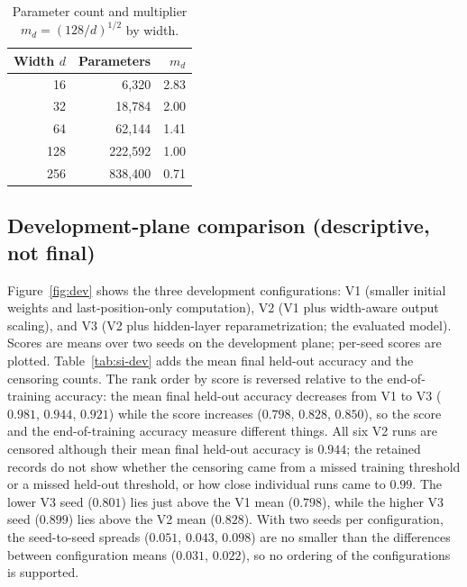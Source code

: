 \documentclass{article}
\begin{document}
\begin{table}[h]
\centering
\caption{Parameter count and multiplier $m_d=(128/d)^{1/2}$ by width.}
\label{tab:si-model}
\small
\begin{tabular}{rrr}
\toprule
Width $d$ & Parameters & $m_d$ \\
\midrule
16 & 6{,}320 & 2.83 \\
32 & 18{,}784 & 2.00 \\
64 & 62{,}144 & 1.41 \\
128 & 222{,}592 & 1.00 \\
256 & 838{,}400 & 0.71 \\
\bottomrule
\end{tabular}
\end{table}

\subsection{Development-plane comparison (descriptive, not final)}
\label{sec:si-dev}
Figure~\ref{fig:dev} shows the three development configurations: V1 (smaller initial weights and last-position-only computation), V2 (V1 plus width-aware output scaling), and V3 (V2 plus hidden-layer reparametrization; the evaluated model). Scores are means over two seeds on the development plane; per-seed scores are plotted. Table~\ref{tab:si-dev} adds the mean final held-out accuracy and the censoring counts. The rank order by score is reversed relative to the end-of-training accuracy: the mean final held-out accuracy decreases from V1 to V3 ($0.981$, $0.944$, $0.921$) while the score increases ($0.798$, $0.828$, $0.850$), so the score and the end-of-training accuracy measure different things. All six V2 runs are censored although their mean final held-out accuracy is $0.944$; the retained records do not show whether the censoring came from a missed training threshold or a missed held-out threshold, or how close individual runs came to $0.99$. The lower V3 seed ($0.801$) lies just above the V1 mean ($0.798$), while the higher V3 seed ($0.899$) lies above the V2 mean ($0.828$). With two seeds per configuration, the seed-to-seed spreads ($0.051$, $0.043$, $0.098$) are no smaller than the differences between configuration means ($0.031$, $0.022$), so no ordering of the configurations is supported.
\end{document}
